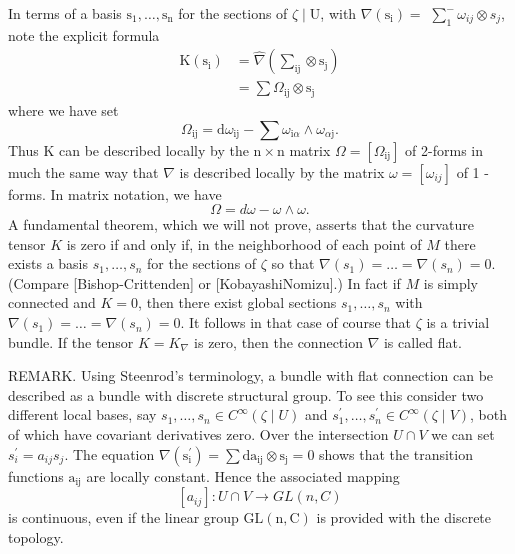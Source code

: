 \documentclass[10pt]{article}
\begin{document}
In terms of a basis $\mathrm{s}_{1}, \ldots, \mathrm{s}_{\mathrm{n}}$ for the sections of $\zeta \mid \mathrm{U}$, with $\nabla\left(\mathrm{s}_{\mathrm{i}}\right)=$ $\sum_{1}^{-} \omega_{i j} \otimes s_{j}$, note the explicit formula
$$
\begin{aligned}
\mathrm{K}\left(\mathrm{s}_{\mathrm{i}}\right) &=\hat{\nabla}\left(\sum_{\mathrm{ij}} \otimes \mathrm{s}_{\mathrm{j}}\right) \\
&=\sum \Omega_{\mathrm{ij}} \otimes \mathrm{s}_{\mathrm{j}}
\end{aligned}
$$
where we have set
$$
\Omega_{\mathrm{ij}}=\mathrm{d} \omega_{\mathrm{ij}}-\sum \omega_{\mathrm{i} \alpha} \wedge \omega_{\alpha \mathrm{j}} .
$$
Thus $\mathrm{K}$ can be described locally by the $\mathrm{n} \times \mathrm{n}$ matrix $\Omega=\left[\Omega_{\mathrm{ij}}\right]$ of 2-forms in much the same way that $\nabla$ is described locally by the matrix $\omega=\left[\omega_{i j}\right]$ of 1 -forms. In matrix notation, we have
$$
\Omega=d \omega-\omega \wedge \omega .
$$
A fundamental theorem, which we will not prove, asserts that the curvature tensor $K$ is zero if and only if, in the neighborhood of each point of $M$ there exists a basis $s_{1}, \ldots, s_{n}$ for the sections of $\zeta$ so that $\nabla\left(s_{1}\right)=\ldots=\nabla\left(s_{n}\right)=0$. (Compare [Bishop-Crittenden] or [KobayashiNomizu].) In fact if $M$ is simply connected and $K=0$, then there exist global sections $s_{1}, \ldots, s_{n}$ with $\nabla\left(s_{1}\right)=\ldots=\nabla\left(s_{n}\right)=0$. It follows in that case of course that $\zeta$ is a trivial bundle. If the tensor $K=K_{\nabla}$ is zero, then the connection $\nabla$ is called flat.

REMARK. Using Steenrod's terminology, a bundle with flat connection can be described as a bundle with discrete structural group. To see this consider two different local bases, say $s_{1}, \ldots, s_{n} \in C^{\infty}(\zeta \mid U)$ and $s_{1}^{\prime}, \ldots, s_{n}^{\prime} \in C^{\infty}(\zeta \mid V)$, both of which have covariant derivatives zero. Over the intersection $U \cap V$ we can set $s_{i}^{\prime}=a_{i j} s_{j}$. The equation $\nabla\left(\mathrm{s}_{\mathrm{i}}^{\prime}\right)=\sum \mathrm{da}_{\mathrm{ij}} \otimes \mathrm{s}_{\mathrm{j}}=0$ shows that the transition functions $\mathrm{a}_{\mathrm{ij}}$ are locally constant. Hence the associated mapping
$$
\left[a_{i j}\right]: U \cap V \rightarrow G L(n, C)
$$
is continuous, even if the linear group $\mathrm{GL}(\mathrm{n}, \mathrm{C})$ is provided with the discrete topology.
\end{document}
